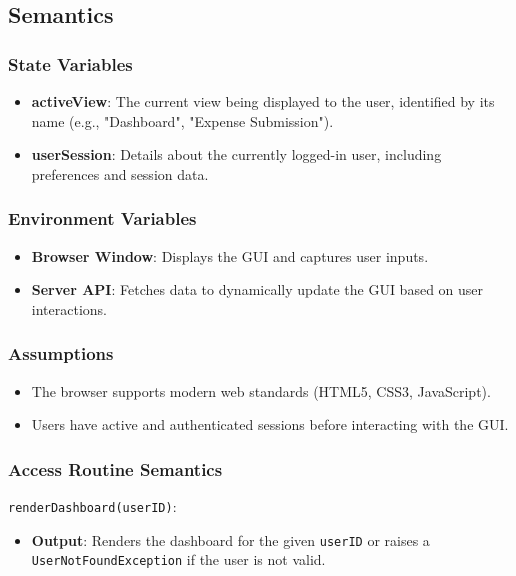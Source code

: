 \documentclass[12pt, titlepage]{article}
\begin{document}
\subsection{Semantics}

\subsubsection{State Variables}
\begin{itemize}
    \item \textbf{activeView}: The current view being displayed to the user, identified by its name (e.g., "Dashboard", "Expense Submission").
    \item \textbf{userSession}: Details about the currently logged-in user, including preferences and session data.
\end{itemize}

\subsubsection{Environment Variables}
\begin{itemize}
    \item \textbf{Browser Window}: Displays the GUI and captures user inputs.
    \item \textbf{Server API}: Fetches data to dynamically update the GUI based on user interactions.
\end{itemize}

\subsubsection{Assumptions}
\begin{itemize}
    \item The browser supports modern web standards (HTML5, CSS3, JavaScript).
    \item Users have active and authenticated sessions before interacting with the GUI.
\end{itemize}

\subsubsection{Access Routine Semantics}

\noindent \texttt{renderDashboard(userID)}:
\begin{itemize}
    \item \textbf{Output}: Renders the dashboard for the given \texttt{userID} or raises a \texttt{UserNotFoundException} if the user is not valid.
\end{itemize}
\end{document}
